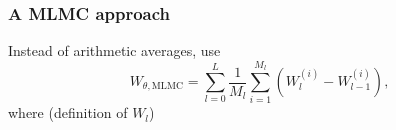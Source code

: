 \subsubsection{A MLMC approach}
Instead of arithmetic averages, use 
\begin{equation}
	W_{\theta,\text{MLMC}} = \sum_{l=0}^{L} \frac{1}{M_l} \sum_{i=1}^{M_l}\left(W_l^{(i)} - W_{l-1}^{(i)}\right),
\end{equation}
where (definition of $W_{l}$)









